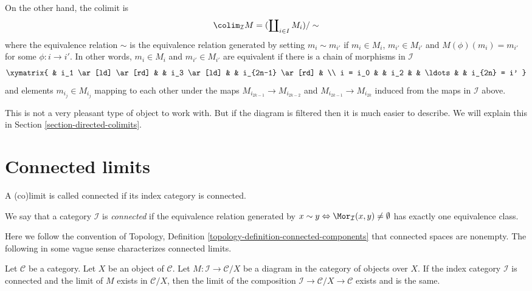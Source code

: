 \medskip\noindent
On the other hand, the colimit is
$$
\colim_\mathcal{I} M
=
(\coprod\nolimits_{i\in I} M_i)/\sim
$$
where the equivalence relation $\sim$ is the equivalence relation
generated by setting $m_i \sim m_{i'}$ if $m_i \in M_i$,
$m_{i'} \in M_{i'}$ and $M(\phi)(m_i) = m_{i'}$ for some
$\phi : i \to i'$. In other words, $m_i \in M_i$
and $m_{i'} \in M_{i'}$ are equivalent if there is a
chain of morphisms in $\mathcal{I}$
$$
\xymatrix{
&
i_1 \ar[ld] \ar[rd] & &
i_3 \ar[ld] & &
i_{2n-1} \ar[rd] & \\
i = i_0 & &
i_2 & &
\ldots & &
i_{2n} = i'
}
$$
and elements $m_{i_j} \in M_{i_j}$ mapping to each other under
the maps $M_{i_{2k-1}} \to M_{i_{2k-2}}$ and $M_{i_{2k-1}}
\to M_{i_{2k}}$ induced from the maps in $\mathcal{I}$ above.

\medskip\noindent
This is not a very pleasant type of object to work with.
But if the diagram is filtered then it is much easier to
describe. We will explain this in Section \ref{section-directed-colimits}.



\section{Connected limits}
\label{section-connected-limits}

\noindent
A (co)limit is called connected if its index category is connected.

\begin{definition}
\label{definition-category-connected}
We say that a category $\mathcal{I}$ is {\it connected}
if the equivalence relation generated by
$x \sim y \Leftrightarrow \Mor_\mathcal{I}(x, y) \not = \emptyset$
has exactly one equivalence class.
\end{definition}

\noindent
Here we follow the convention of
Topology, Definition \ref{topology-definition-connected-components}
that connected spaces are nonempty.
The following in some vague sense characterizes connected limits.

\begin{lemma}
\label{lemma-connected-limit-over-X}
Let $\mathcal{C}$ be a category.
Let $X$ be an object of $\mathcal{C}$.
Let $M : \mathcal{I} \to \mathcal{C}/X$ be a diagram
in the category of objects over $X$.
If the index category $\mathcal{I}$ is connected
and the limit of $M$ exists in $\mathcal{C}/X$,
then the limit of the composition
$\mathcal{I} \to \mathcal{C}/X \to \mathcal{C}$
exists and is the same.
\end{lemma}

